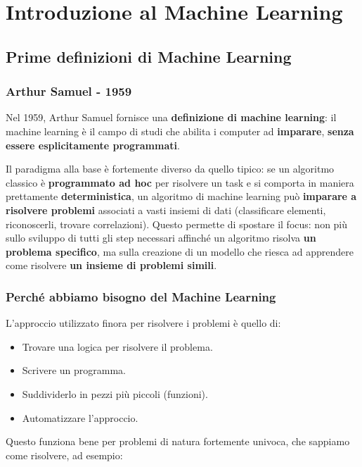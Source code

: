 \chapter{Introduzione al Machine Learning}

\section{Prime definizioni di Machine Learning}

\subsection{Arthur Samuel - 1959}

Nel 1959, Arthur Samuel fornisce una \textbf{definizione di machine learning}: il machine learning \`e il campo di studi che abilita i computer ad \textbf{imparare}, \textbf{senza essere esplicitamente programmati}.

Il paradigma alla base \`e fortemente diverso da quello tipico: se un algoritmo classico \`e \textbf{programmato ad hoc} per risolvere un task e si comporta in maniera prettamente \textbf{deterministica}, un algoritmo di machine learning pu\`o \textbf{imparare a risolvere problemi} associati a vasti insiemi di dati (classificare elementi, riconoscerli, trovare correlazioni). Questo permette di spostare il focus: non pi\`u sullo sviluppo di tutti gli step necessari affinch\'e un algoritmo risolva \textbf{un problema specifico}, ma sulla creazione di un modello che riesca ad apprendere come risolvere \textbf{un insieme di problemi simili}.

\subsection{Perch\'e abbiamo bisogno del Machine Learning}

L'approccio utilizzato finora per risolvere i problemi \`e quello di:

\begin{itemize}
\item Trovare una logica per risolvere il problema.
\item Scrivere un programma.
\item Suddividerlo in pezzi pi\`u piccoli (funzioni).
\item Automatizzare l'approccio.
\end{itemize}

Questo funziona bene per problemi di natura fortemente univoca, che sappiamo come risolvere, ad esempio:

